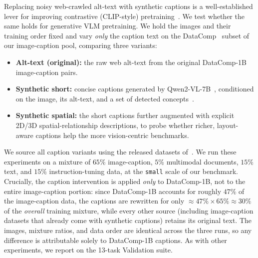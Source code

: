 Replacing noisy web-crawled alt-text with synthetic captions is a well-established lever for improving contrastive (CLIP-style) pretraining~\citep{li2024if,yu2024capsfusion,ghosh2025concept}.
We test whether the same holds for generative VLM pretraining.
We hold the images and their training order fixed and vary \emph{only} the caption text on the DataComp~\citep{gadre2023datacomp} subset of our image-caption pool, comparing three variants:
\begin{itemize}[leftmargin=*, itemsep=2pt, topsep=0pt, parsep=0pt, partopsep=0pt]
    \item \textbf{Alt-text (original):} the raw web alt-text from the original DataComp-1B image-caption pairs.
    \item \textbf{Synthetic short:} concise captions generated by Qwen2-VL-7B~\citep{wang2024qwen2}, conditioned on the image, its alt-text, and a set of detected concepts~\citep{ghosh2025concept}.
    \item \textbf{Synthetic spatial:} the short captions further augmented with explicit 2D/3D spatial-relationship descriptions, to probe whether richer, layout-aware captions help the more vision-centric benchmarks.
\end{itemize}
We source all caption variants using the released datasets of~\citet{ghosh2025concept}. We run these experiments on a mixture of $65$\% image-caption, $5$\% multimodal documents, $15$\% text, and $15$\% instruction-tuning data, at the \texttt{small} scale of our benchmark.
Crucially, the caption intervention is applied \emph{only} to DataComp-1B, not to the entire image-caption portion: since DataComp-1B accounts for roughly $47$\% of the image-caption data, the captions are rewritten for only $\approx\!47\%\times65\% \approx 30\%$ of the \emph{overall} training mixture, while every other source (including image-caption datasets that already come with synthetic captions) retains its original text.
The images, mixture ratios, and data order are identical across the three runs, so any difference is attributable solely to DataComp-1B captions. As with other experiments, we report on the 13-task Validation suite.



